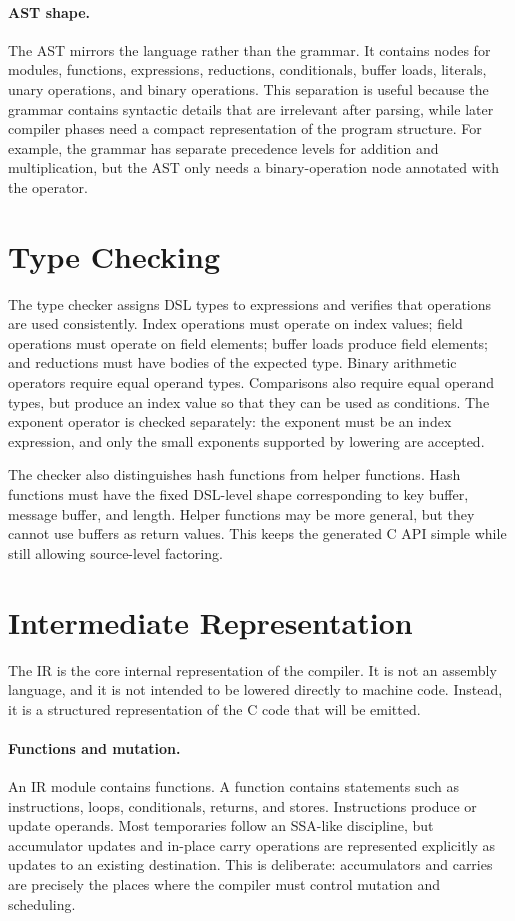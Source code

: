 \paragraph{AST shape.}
The AST mirrors the language rather than the grammar. It contains nodes for modules, functions, expressions, reductions, conditionals, buffer loads, literals, unary operations, and binary operations. This separation is useful because the grammar contains syntactic details that are irrelevant after parsing, while later compiler phases need a compact representation of the program structure. For example, the grammar has separate precedence levels for addition and multiplication, but the AST only needs a binary-operation node annotated with the operator.

\section{Type Checking}
\label{sec:type-checking}

The type checker assigns DSL types to expressions and verifies that operations are used consistently. Index operations must operate on index values; field operations must operate on field elements; buffer loads produce field elements; and reductions must have bodies of the expected type. Binary arithmetic operators require equal operand types. Comparisons also require equal operand types, but produce an index value so that they can be used as conditions. The exponent operator is checked separately: the exponent must be an index expression, and only the small exponents supported by lowering are accepted.

The checker also distinguishes hash functions from helper functions. Hash functions must have the fixed DSL-level shape corresponding to key buffer, message buffer, and length. Helper functions may be more general, but they cannot use buffers as return values. This keeps the generated C API simple while still allowing source-level factoring.

\section{Intermediate Representation}
\label{sec:ir}

The IR is the core internal representation of the compiler. It is not an assembly language, and it is not intended to be lowered directly to machine code. Instead, it is a structured representation of the C code that will be emitted.

\paragraph{Functions and mutation.}
An IR module contains functions. A function contains statements such as instructions, loops, conditionals, returns, and stores. Instructions produce or update operands. Most temporaries follow an SSA-like discipline, but accumulator updates and in-place carry operations are represented explicitly as updates to an existing destination. This is deliberate: accumulators and carries are precisely the places where the compiler must control mutation and scheduling.

